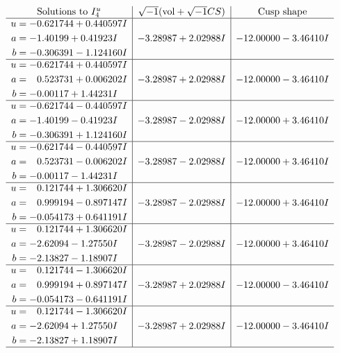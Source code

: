 \documentclass[1p]{elsarticle_modified}
\theoremstyle{definition}
\newcommand{\I}{\sqrt{-1}}
\begin{document}
$$\begin{array}{c|c|c}  
\text{Solutions to }I^u_{4}& \I (\text{vol} + \sqrt{-1}CS) & \text{Cusp shape}\\
 \hline 
\begin{aligned}
u &= -0.621744 + 0.440597 I \\
a &= -1.40199 + 0.41923 I \\
b &= -0.306391 - 1.124160 I\end{aligned}
 & -3.28987 + 2.02988 I & -12.00000 - 3.46410 I \\ \hline\begin{aligned}
u &= -0.621744 + 0.440597 I \\
a &= \phantom{-}0.523731 + 0.006202 I \\
b &= -0.00117 + 1.44231 I\end{aligned}
 & -3.28987 + 2.02988 I & -12.00000 - 3.46410 I \\ \hline\begin{aligned}
u &= -0.621744 - 0.440597 I \\
a &= -1.40199 - 0.41923 I \\
b &= -0.306391 + 1.124160 I\end{aligned}
 & -3.28987 - 2.02988 I & -12.00000 + 3.46410 I \\ \hline\begin{aligned}
u &= -0.621744 - 0.440597 I \\
a &= \phantom{-}0.523731 - 0.006202 I \\
b &= -0.00117 - 1.44231 I\end{aligned}
 & -3.28987 - 2.02988 I & -12.00000 + 3.46410 I \\ \hline\begin{aligned}
u &= \phantom{-}0.121744 + 1.306620 I \\
a &= \phantom{-}0.999194 - 0.897147 I \\
b &= -0.054173 + 0.641191 I\end{aligned}
 & -3.28987 - 2.02988 I & -12.00000 + 3.46410 I \\ \hline\begin{aligned}
u &= \phantom{-}0.121744 + 1.306620 I \\
a &= -2.62094 - 1.27550 I \\
b &= -2.13827 - 1.18907 I\end{aligned}
 & -3.28987 - 2.02988 I & -12.00000 + 3.46410 I \\ \hline\begin{aligned}
u &= \phantom{-}0.121744 - 1.306620 I \\
a &= \phantom{-}0.999194 + 0.897147 I \\
b &= -0.054173 - 0.641191 I\end{aligned}
 & -3.28987 + 2.02988 I & -12.00000 - 3.46410 I \\ \hline\begin{aligned}
u &= \phantom{-}0.121744 - 1.306620 I \\
a &= -2.62094 + 1.27550 I \\
b &= -2.13827 + 1.18907 I\end{aligned}
 & -3.28987 + 2.02988 I & -12.00000 - 3.46410 I\\
 \hline 
 \end{array}$$\newpage
\end{document}
